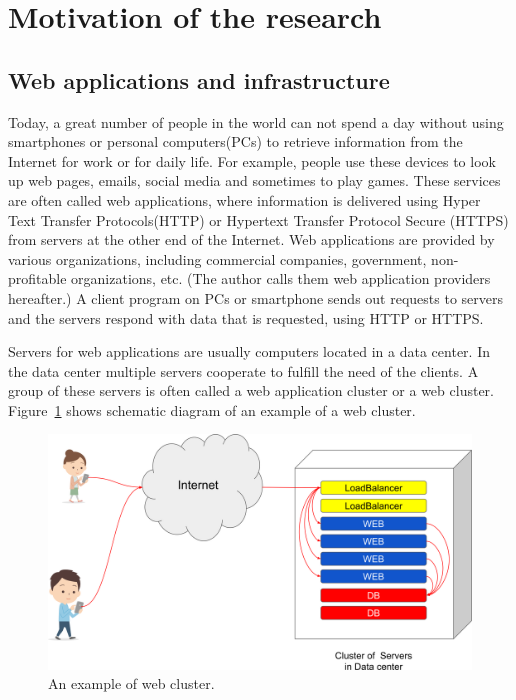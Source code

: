 
\section{Motivation of the research}

\subsection{Web applications and infrastructure}

Today, a great number of people in the world can not spend a day without using smartphones or personal computers(PCs) to retrieve information from the Internet for work or for daily life.
For example, people use these devices to look up web pages, emails, social media and sometimes to play games.
These services are often called web applications, where information is delivered using Hyper Text Transfer Protocols(HTTP) or Hypertext Transfer Protocol Secure (HTTPS) from servers at the other end of the Internet.
Web applications are provided by various organizations, including commercial companies, government, non-profitable organizations, etc.
(The author calls them web application providers hereafter.)
A client program on PCs or smartphone sends out requests to servers and the servers respond with data that is requested, using HTTP or HTTPS. 

Servers for web applications are usually computers located in a data center.
In the data center multiple servers cooperate to fulfill the need of the clients.
A group of these servers is often called a web application cluster or a web cluster.
Figure~\ref{fig:web_cluster} shows schematic diagram of an example of a web cluster.

\begin{figure}[h]
\begin{center}
\includegraphics[width=0.8\columnwidth]{Figs/web_cluster.png}
\end{center}
\caption{
An example of web cluster.
}
\label{fig:web_cluster}
\end{figure}

